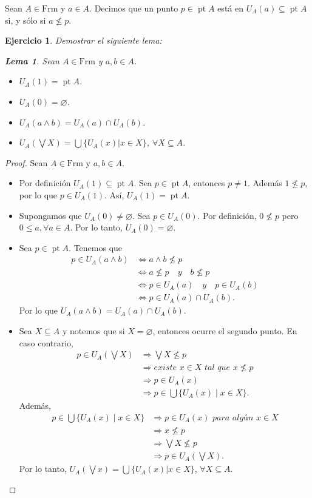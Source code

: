 \documentclass[12pt,letterpaper,titlepage]{article}
\let\emptyset\varnothing
\newtheorem{exe}{Ejercicio}
\newtheorem{lemma}{Lema}
\theoremstyle{definition}
\newcommand\Sup{\bigvee}
\renewcommand\inf{\wedge}
\newcommand\<{\langle}
\renewcommand\>{\rangle}
\newcommand{\Frm}{\mathrm{Frm}}
\DeclareMathOperator{\pt}{pt}
\begin{document}
Sean $A\in \Frm$ y $a\in A$. Decimos que un punto $p\in \pt A$ está en $U_A(a)\subseteq \pt A$ si, y sólo si $a\not\leq p$.
\begin{exe}%
Demostrar el siguiente lema:
  \begin{lemma}
    Sean $A\in \Frm$ y $a,b\in A$.
    \begin{itemize}
        \item $U_A(1)=\pt A$.
        \item $U_A(0)=\emptyset$.
        \item $U_A(a\inf b)=U_A(a)\cap U_A(b)$.
        \item $U_A(\Sup X)=\bigcup \{U_A(x)|x\in X\}$, $\forall X\subseteq A$.
    \end{itemize}
  \end{lemma}
\end{exe}
\begin{proof}
  Sean $A\in \Frm$ y $a,b\in A$.
\begin{itemize}
\item Por definición $U_A(1)\subseteq \pt A$. Sea $p\in \pt A$, entonces $p\neq 1$. Además $1\not\leq p$, por lo que $p\in U_A(1)$. Así, $U_A(1)=\pt A$.
\item Supongamos que $U_A(0)\neq \emptyset$. Sea $p\in U_A(0)$. Por definición, $0\not\leq p$ pero $0\leq a, \forall a\in A$. Por lo tanto, $U_A(0)=\emptyset$.
\item Sea $p\in \pt A$. Tenemos que
\begin{align*}
p\in U_A(a\wedge b)&\iff a\wedge b\not\leq p\\
&\iff a\not\leq p\quad y\quad b\not\leq p\\
&\iff p\in U_A(a)\quad y\quad p\in U_A(b)\\
&\iff p\in U_A(a)\cap U_A(b).
\end{align*}
Por lo que $U_A(a\wedge b)=U_A(a)\cap U_A(b)$.
\item Sea $X\subseteq A$ y notemos que si $X=\emptyset$, entonces ocurre el segundo punto. En caso contrario,
\begin{align*}
p\in U_A(\bigvee X)&\Rightarrow \bigvee X\not\leq p\\
&\Rightarrow \textit{existe }x\in X\textit{ tal que }x\not\leq p\\
&\Rightarrow p\in U_A(x)\\
&\Rightarrow p\in \bigcup \{U_A(x)\mid x\in X\}.
\end{align*}
Además,
\begin{align*}
p\in \bigcup\{U_A(x)\mid x\in X\}&\Rightarrow p\in U_A(x)\textit{ para algún }x\in X\\
&\Rightarrow x\not \leq p\\
&\Rightarrow \bigvee X\not\leq p\\
&\Rightarrow p\in U_A(\bigvee X).
\end{align*}
Por lo tanto, $U_A(\Sup x)=\bigcup \{U_A(x)|x\in X\}$, $\forall X\subseteq A$.
\end{itemize}
\end{proof}
\end{document}
